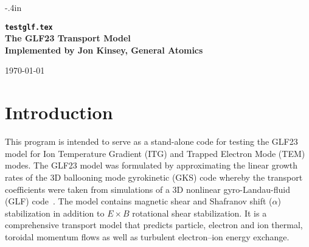 
\headheight 0pt \headsep 0pt          
\topmargin -.4in  \textheight 9.4in
\oddsidemargin 0pt \textwidth 6.5in

\newcommand{\Partial}[2]{\frac{\partial #1}{\partial #2}}
\newcommand{\jacobian}{{\cal J}}
\newcommand{\bverb}{\begin{verbatim}}
\newcommand{\everb}{\end{verbatim}}
\newcommand{\bcent}{\begin{center}}
\newcommand{\ecent}{\end{center}}
\newcommand{\bitem}{\begin{itemize}}
\newcommand{\eitem}{\end{itemize}}
\newcommand{\benum}{\begin{enumerate}}
\newcommand{\eenum}{\end{enumerate}}
\newcommand{\be}{\begin}
\newcommand{\ev}{\end}



\begin{center} 
{\bf {\tt testglf.tex} \\
The GLF23 Transport Model \\
Implemented by Jon Kinsey, General Atomics \\}

\vspace{1pc}\today
\end{center}

\rm
\section{Introduction}
This program is intended to serve as a stand-alone code
for testing the GLF23 model for Ion Temperature Gradient (ITG)
and Trapped Electron Mode (TEM) modes. The GLF23 model was
formulated by approximating the linear growth rates of the 3D
ballooning mode gyrokinetic (GKS) code whereby the transport
coefficients were taken from simulations of a 3D nonlinear
gyro-Landau-fluid (GLF) code~\cite{waltz97}. The model contains
magnetic shear and Shafranov shift ($\alpha$) stabilization
in addition to $E\times B$ rotational shear stabilization.
It is a comprehensive transport model that predicts particle, electron 
and ion thermal, toroidal momentum flows as well as turbulent 
electron--ion energy exchange.

